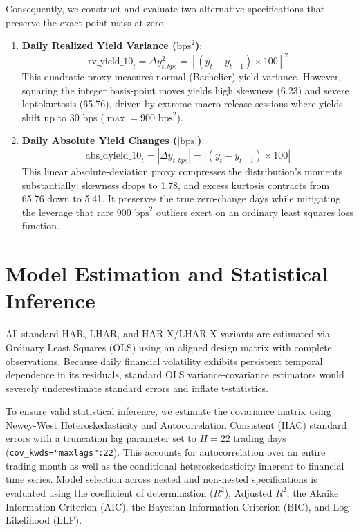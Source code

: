 \documentclass{report}
\begin{document}
\vspace{1em}

Consequently, we construct and evaluate two alternative specifications that preserve the exact point-mass at zero:
\begin{enumerate}
    \item \textbf{Daily Realized Yield Variance ($\text{bps}^2$)}:
    \begin{equation}
    \text{rv\_yield\_10}_t = \Delta y_{t, bps}^2 = \left[(y_t - y_{t-1}) \times 100\right]^2
    \end{equation}
    This quadratic proxy measures normal (Bachelier) yield variance. However, squaring the integer basis-point moves yields high skewness (6.23) and severe leptokurtosis (65.76), driven by extreme macro release sessions where yields shift up to 30 bps ($\max = 900\text{ bps}^2$). 
    
    \item \textbf{Daily Absolute Yield Changes ($|\text{bps}|$)}:
    \begin{equation}
    \text{abs\_dyield\_10}_t = |\Delta y_{t, bps}| = |(y_t - y_{t-1}) \times 100|
    \end{equation}
    This linear absolute-deviation proxy compresses the distribution's moments substantially: skewness drops to 1.78, and excess kurtosis contracts from 65.76 down to 5.41. It preserves the true zero-change days while mitigating the leverage that rare $900\text{ bps}^2$ outliers exert on an ordinary least squares loss function. 
\end{enumerate}

\chapter{Model Estimation and Statistical Inference}

All standard HAR, LHAR, and HAR-X/LHAR-X variants are estimated via Ordinary Least Squares (OLS) using an aligned design matrix with complete observations. Because daily financial volatility exhibits persistent temporal dependence in its residuals, standard OLS variance-covariance estimators would severely underestimate standard errors and inflate t-statistics. 
\vspace{1em}

To ensure valid statistical inference, we estimate the covariance matrix using Newey-West Heteroskedasticity and Autocorrelation Consistent (HAC) standard errors with a truncation lag parameter set to $H=22$ trading days (\texttt{cov\_kwds="maxlags":22}). This accounts for autocorrelation over an entire trading month as well as the conditional heteroskedasticity inherent to financial time series. Model selection across nested and non-nested specifications is evaluated using the coefficient of determination ($R^2$), Adjusted $R^2$, the Akaike Information Criterion (AIC), the Bayesian Information Criterion (BIC), and Log-Likelihood (LLF). 
\end{document}
